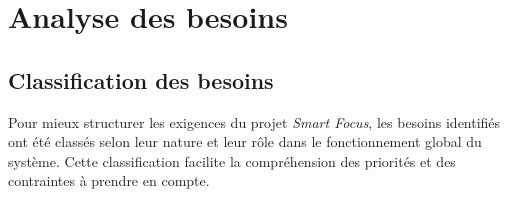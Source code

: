 \documentclass[12pt,a4paper]{report}
\begin{document}
\section{Analyse des besoins}

\subsection{Classification des besoins}

Pour mieux structurer les exigences du projet \textit{Smart Focus}, les besoins identifiés ont été classés selon leur nature et leur rôle dans le fonctionnement global du système. Cette classification facilite la compréhension des priorités et des contraintes à prendre en compte.
\end{document}
